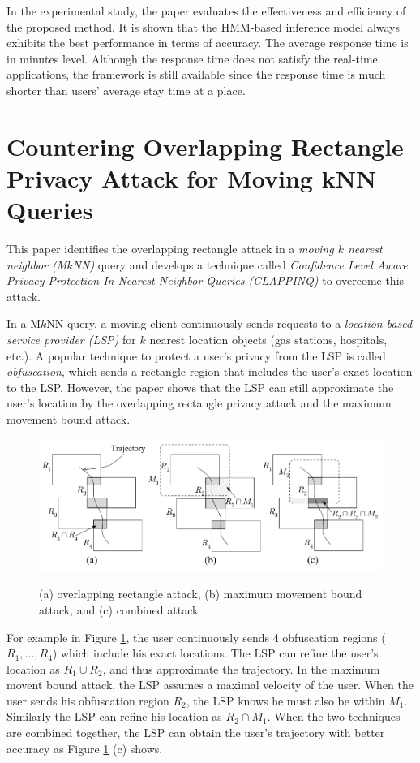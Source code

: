 \documentclass[paper=a4, fontsize=18pt]{article} %
\numberwithin{equation}{section} %
\numberwithin{figure}{section} %
\numberwithin{table}{section} %
\begin{document}
In the experimental study, the paper evaluates the effectiveness and efficiency of the proposed method. It is shown that the HMM-based inference model always exhibits the best performance in terms of accuracy. The average response time is in minutes level. Although the response time does not satisfy the real-time applications, the framework is still available since the response time is much shorter than users' average stay time at a place.

\section{Countering Overlapping Rectangle Privacy Attack for Moving kNN Queries \cite{HKZ13}}

This paper identifies the overlapping rectangle attack in a \emph{moving $k$ nearest neighbor (M$k$NN)} query and develops a technique called \emph{Confidence Level Aware Privacy Protection In Nearest Neighbor Queries (CLAPPINQ)} to overcome this attack.

In a M$k$NN query, a moving client continuously sends requests to a \emph{location-based service provider (LSP)} for $k$ nearest location objects (gas stations, hospitals, etc.). A popular technique to protect a user's privacy from the LSP is called \emph{obfuscation}, which sends a rectangle region that includes the user's exact location to the LSP. However, the paper shows that the LSP can still approximate the user's location by the overlapping rectangle privacy attack and the maximum movement bound attack.

\begin{figure}
  \centering
  \includegraphics[width=.9\linewidth]{7_18_attack.png}\\
  \caption{(a) overlapping rectangle attack, (b) maximum movement bound attack, and (c) combined attack}\label{fig:attack}
\end{figure}

For example in Figure \ref{fig:attack}, the user continuously sends 4 obfuscation regions ($R_1, ..., R_4$) which include his exact locations. The LSP can refine the user's location as $R_1 \cup R_2$, and thus approximate the trajectory. In the maximum movent bound attack, the LSP assumes a maximal velocity of the user. When the user sends his obfuscation region $R_2$, the LSP knows he must also be within $M_1$. Similarly the LSP can refine his location as $R_2 \cap M_1$. When the two techniques are combined together, the LSP can obtain the user's trajectory with better accuracy as Figure \ref{fig:attack} (c) shows.
\end{document}
